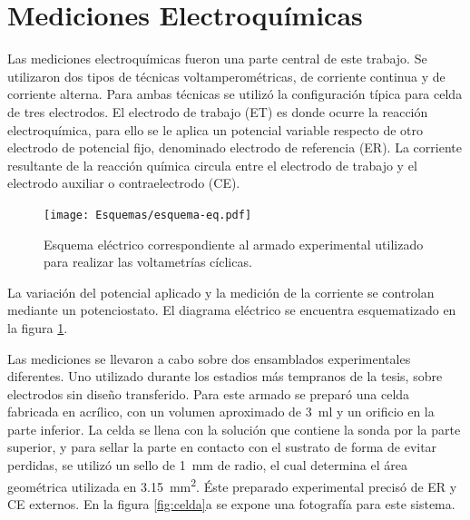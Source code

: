 \section{Mediciones Electroquímicas}\label{sec:medidas_eq}
		
			Las mediciones electroquímicas fueron una parte central de este trabajo. Se utilizaron dos tipos de técnicas voltamperométricas, de corriente continua y de corriente alterna. 	%
			Para ambas técnicas se utilizó la configuración típica para celda de tres electrodos.\cite{Wi2000} El electrodo de trabajo (ET) es donde ocurre la reacción electroquímica, para ello se le aplica un potencial variable respecto de otro electrodo de potencial fijo, denominado electrodo de referencia (ER). La corriente resultante de la reacción química circula entre el electrodo de trabajo y el electrodo auxiliar o contraelectrodo (CE). 

					\begin{figure}[ht!]
			 		  \begin{center}
			 		  \texttt{[image: Esquemas/esquema-eq.pdf]}
			 		  \caption[Circuito eléctrico EQ]{Esquema eléctrico correspondiente al armado experimental utilizado para realizar las voltametrías cíclicas.}
			 		  \label{fig:eq-circuito}
			 		  \end{center}
			 		  \end{figure}

			La variación del potencial aplicado y la medición de la corriente se controlan mediante un potenciostato. El diagrama eléctrico se encuentra esquematizado en la figura \ref{fig:eq-circuito}.

			Las mediciones se llevaron a cabo sobre dos ensamblados experimentales diferentes. Uno utilizado durante los estadios más tempranos de la tesis, sobre electrodos sin diseño transferido. Para este armado se preparó una celda fabricada en acrílico, con un volumen aproximado de \SI{3}{\ml} y un orificio en la parte inferior. La celda se llena con la solución que contiene la sonda por la parte superior, y para sellar la parte en contacto con el sustrato de forma de evitar perdidas, se utilizó un sello de \SI{1}{\mm} de radio, el cual determina el área geométrica utilizada en \SI{3.15}{\mm^{2}}. Éste preparado experimental precisó de ER y CE externos. En la figura \ref{fig:celda}a se expone una fotografía para este sistema. 

